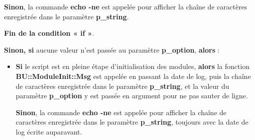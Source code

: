 \documentclass[a4paper,10pt]{article}
\begin{document}
\begin{itemize}
{\begin{itemize}
{\begin{itemize}
{                        \setlength{\parskip}{1em}

                        \begin{justify}
                            \textbf{\color{cond}Sinon}, la commande \textbf{\color{cmds}echo -ne} est appelée pour afficher la chaîne de caractères enregistrée dans le paramètre \textbf{\color{vars}p\_string}.
                        \end{justify}

                        \begin{justify}
                            \textbf{\color{cond}Fin de la condition « if »}.
                    \end{justify}
                    }
                \end{itemize}

                \item
                {
                    \setlength{\parskip}{2em}

                    \begin{justify}
                        \textbf{\color{case}Sinon, si} aucune valeur n'est passée au paramètre \textbf{\color{vars}p\_option}, \textbf{\color{case}alors} :
                    \end{justify}

                    \setlength{\parskip}{1em}
                }

                \begin{itemize}
                    \item
                    {
                        \begin{justify}
                            \textbf{\color{cond}Si} le script est en pleine étape d'initialisation des modules, \textbf{\color{cond}alors} la fonction \textbf{\color{func}BU::ModuleInit::Msg} est appelée en passant la date de log, puis la chaîne de caractères enregistrée dans le paramètre \textbf{\color{vars}p\_string}, et la valeur du paramètre \textbf{\color{vars}p\_option} y est passée en argument pour ne pas sauter de ligne. 
                        \end{justify}

                        \setlength{\parskip}{1em}

                        \begin{justify}
                            \textbf{\color{cond}Sinon}, la commande \textbf{\color{cmds}echo -ne} est appelée pour afficher la chaîne de caractères enregistrée dans le paramètre \textbf{\color{vars}p\_string}, toujours avec la date de log écrite auparavant.
                        \end{justify}

}
\end{itemize}}
\end{itemize}}
\end{itemize}
\end{document}
